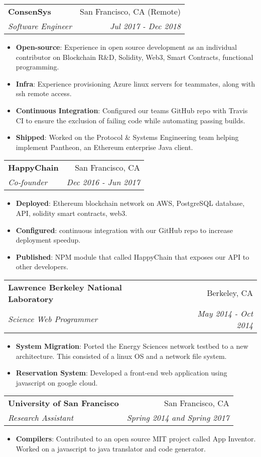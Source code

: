 \documentclass[letterpaper,11pt]{article}
\makeatletter
\newcommand{\resumeItem}[2]{
  \item\small{
    \textbf{#1}{: #2 \vspace{-2pt}}
  }
}
\newcommand{\resumeSubheading}[4]{
  \vspace{-1pt}\item
    \begin{tabular*}{0.97\textwidth}[t]{l@{\extracolsep{\fill}}r}
      \textbf{#1} & #2 \\
      \textit{\small#3} & \textit{\small #4} \\
    \end{tabular*}\vspace{-5pt}
}
\newcommand{\resumeItemListStart}{\begin{itemize}}
\newcommand{\resumeItemListEnd}{\end{itemize}\vspace{-5pt}}
\makeatother
\begin{document}
    \resumeSubheading
      {ConsenSys}{San Francisco, CA (Remote)}
      {Software Engineer}{Jul 2017 - Dec 2018}
      \resumeItemListStart
        \resumeItem{Open-source}
          {Experience in open source development as an individual contributor on Blockchain R\&D, Solidity, Web3, Smart Contracts, functional programming.}
          \resumeItem{Infra}
            {Experience provisioning Azure linux servers for teammates, along with ssh remote access.}
        \resumeItem{Continuous Integration}
          {Configured our teams GitHub repo with Travis CI to ensure the exclusion of failing code while automating passing builds.}

        \resumeItem{Shipped}
          {Worked on the Protocol \& Systems Engineering team helping implement Pantheon, an Ethereum enterprise Java client.}
      \resumeItemListEnd


    \resumeSubheading
      {HappyChain}{San Francisco, CA}
      {Co-founder}{Dec 2016 - Jun 2017}
      \resumeItemListStart
        \resumeItem{Deployed}
          {Ethereum blockchain network on AWS, PostgreSQL database, API, solidity smart contracts, web3.}
        \resumeItem{Configured}
          {continuous integration with our GitHub repo to increase deployment speedup.}
        \resumeItem{Published}
          {NPM module that called HappyChain that exposes our API to other developers.}
       \resumeItemListEnd


    \resumeSubheading
      {Lawrence Berkeley National Laboratory}{Berkeley, CA}
      {Science Web Programmer}{May 2014 - Oct 2014}
      \resumeItemListStart
        \resumeItem{System Migration}
          {Ported the Energy Sciences network testbed to a new architecture. This consisted of a linux OS and a network file system.}
        \resumeItem{Reservation System}
          {Developed a front-end web application using javascript on google cloud.}
       \resumeItemListEnd

    \resumeSubheading
      {University of San Francisco}{San Francisco, CA}
      {Research Assistant}{Spring 2014 and Spring 2017}
      \resumeItemListStart
        \resumeItem{Compilers}
          {Contributed to an open source MIT project called App Inventor. Worked on a javascript to java translator and code generator.}
      \resumeItemListEnd
\end{document}
